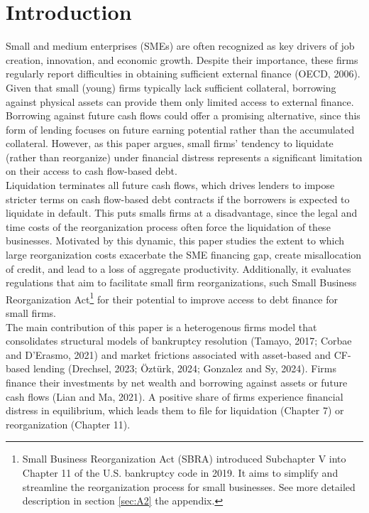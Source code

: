 \documentclass[12pt]{article}
\begin{document}
\section{Introduction \label{sec:introduction}} 
Small and medium enterprises (SMEs) are often recognized as key drivers of job creation, innovation, and economic growth. Despite their importance, these firms regularly report difficulties in obtaining sufficient external finance (OECD, 2006). Given that small (young) firms typically lack sufficient collateral, borrowing against physical assets can provide them only limited access to external finance. Borrowing against future cash flows could offer a promising alternative, since this form of lending focuses on future earning potential rather than the accumulated collateral. However, as this paper argues, small firms' tendency to liquidate (rather than reorganize) under financial distress represents a significant limitation on their access to cash flow-based debt. \vspace{3mm} \\
Liquidation terminates all future cash flows, which drives lenders to impose stricter terms on cash flow-based debt contracts if the borrowers is expected to liquidate in default. This puts smalls firms at a disadvantage, since the legal and time costs of the reorganization process often force the liquidation of these businesses. Motivated by this dynamic, this paper studies the extent to which large reorganization costs exacerbate the SME financing gap, create misallocation of credit, and lead to a loss of aggregate productivity. Additionally, it evaluates regulations that aim to facilitate small firm reorganizations, such Small Business Reorganization Act\footnote{Small Business Reorganization Act (SBRA) introduced Subchapter V into Chapter 11 of the U.S. bankruptcy code in 2019. It aims to simplify and streamline the reorganization process for small businesses. See more detailed description in section \ref{sec:A2} the appendix. } for their potential to improve access to debt finance for small firms. \vspace{3mm} \\
The main contribution of this paper is a heterogenous firms model that consolidates structural models of bankruptcy resolution (Tamayo, 2017; Corbae and D'Erasmo, 2021) and market frictions associated with asset-based and CF-based lending (Drechsel, 2023; Öztürk, 2024; Gonzalez and Sy, 2024). Firms finance their investments by net wealth and borrowing against assets or future cash flows (Lian and Ma, 2021). A positive share of firms experience financial distress in equilibrium, which leads them to file for liquidation (Chapter 7) or reorganization (Chapter 11).
\end{document}
